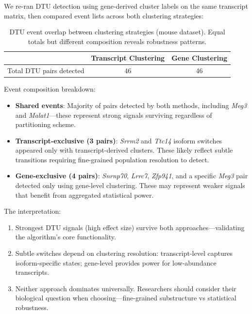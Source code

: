 We re-ran DTU detection using gene-derived cluster labels on the same transcript matrix, then compared event lists across both clustering strategies:

\begin{table}[htbp]
\centering
\begin{tabular}{lcc}
    \toprule
    & \textbf{Transcript Clustering} & \textbf{Gene Clustering} \\
    \midrule
    Total DTU pairs detected & 46 & 46 \\
    \bottomrule
\end{tabular}
\caption{DTU event overlap between clustering strategies (mouse dataset). Equal totals but different composition reveals robustness patterns.}
\label{tab:dtu-robustness}
\end{table}

Event composition breakdown:
\begin{itemize}
    \item \textbf{Shared events}: Majority of pairs detected by both methods, including \textit{Meg3} and \textit{Malat1}---these represent strong signals surviving regardless of partitioning scheme.
    
    \item \textbf{Transcript-exclusive (3 pairs)}: \textit{Srrm2} and \textit{Ttc14} isoform switches appeared only with transcript-derived clusters. These likely reflect subtle transitions requiring fine-grained population resolution to detect.

    \item \textbf{Gene-exclusive (4 pairs)}: \textit{Snrnp70}, \textit{Lrrc7}, \textit{Zfp941}, and a specific \textit{Meg3} pair detected only using gene-level clustering. These may represent weaker signals that benefit from aggregated statistical power.
\end{itemize}

The interpretation:
\begin{enumerate}
    \item Strongest DTU signals (high effect size) survive both approaches---validating the algorithm's core functionality.
    
    \item Subtle switches depend on clustering resolution: transcript-level captures isoform-specific states; gene-level provides power for low-abundance transcripts.
    
    \item Neither approach dominates universally. Researchers should consider their biological question when choosing---fine-grained substructure vs statistical robustness.
\end{enumerate}

